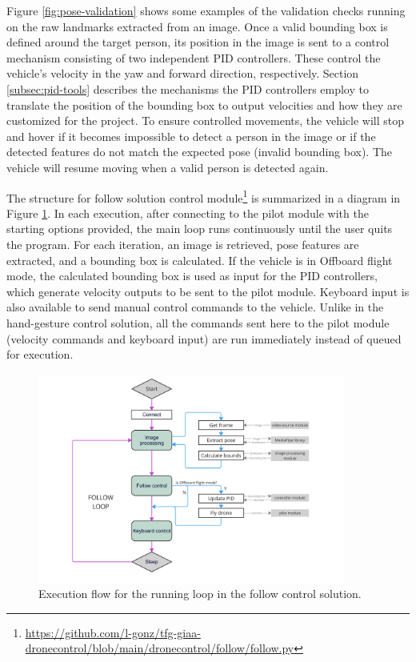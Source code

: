 Figure \ref{fig:pose-validation} shows some examples of the validation checks running on the raw landmarks extracted from an image. Once a valid bounding box is defined around the target person, its position in the image is sent to a control mechanism consisting of two independent PID controllers. These control the vehicle's velocity in the yaw and forward direction, respectively. Section \ref{subsec:pid-tools} describes the mechanisms the PID controllers employ to translate the position of the bounding box to output velocities and how they are customized for the project. To ensure controlled movements, the vehicle will stop and hover if it becomes impossible to detect a person in the image or if the detected features do not match the expected pose (invalid bounding box). The vehicle will resume moving when a valid person is detected again.


The structure for follow solution control module\footnote{\url{https://github.com/l-gonz/tfg-giaa-dronecontrol/blob/main/dronecontrol/follow/follow.py}} is summarized in a diagram in Figure \ref{fig:follow-loop}.
In each execution, after connecting to the pilot module with the starting options provided, the main loop runs continuously until the user quits the program.
For each iteration, an image is retrieved, pose features are extracted, and a bounding box is calculated. If the vehicle is in Offboard flight mode, the calculated bounding box is used as input for the PID controllers, which generate velocity outputs to be sent to the pilot module. Keyboard input is also available to send manual control commands to the vehicle. Unlike in the hand-gesture control solution, all the commands sent here to the pilot module (velocity commands and keyboard input) are run immediately instead of queued for execution.

\begin{figure}
  \centering
  \includegraphics[width=0.9\textwidth, keepaspectratio]{img/follow-loop.jpg}
  \caption{Execution flow for the running loop in the follow control solution.}
  \label{fig:follow-loop}
\end{figure}

